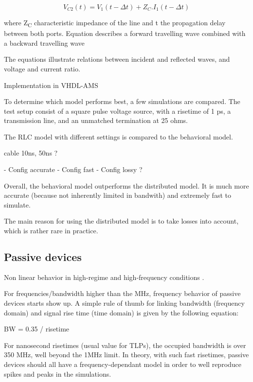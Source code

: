 \begin{equation}
V_{C2}(t) = V_{1}(t - \Delta t) + Z_{C}.I_{1}(t - \Delta t)
\end{equation}

where Z\textsubscript{C} characteristic impedance of the line and \textDelta{}t the propagation delay between both ports.
Equation describes a forward travelling wave combined with a backward travelling wave


The equations illustrate relations between incident and reflected waves, and voltage and current ratio.

Implementation in VHDL-AMS



To determine which model performs best, a few simulations are compared.
The test setup consist of a square pulse voltage source, with a risetime of 1 ps, a transmission line, and an unmatched termination at 25 ohms.

The RLC model with different settings is compared to the behavioral model.

cable 10ns, 50ns ?

- Config accurate
- Config fast
- Config lossy ?

Overall, the behavioral model outperforms the distributed model.
It is much more accurate (because not inherently limited in bandwith) and extremely fast to simulate.

The main reason for using the distributed model is to take losses into account, which is rather rare in practice.

\subsection{Passive devices}

Non linear behavior in high-regime and high-frequency conditions \cite{capa-esd-cz}.

For frequencies/bandwidth higher than the MHz, frequency behavior of  passive devices starts show up.
A simple rule of thumb for linking bandwidth (frequency domain) and signal rise time (time domain) is given by the following equation:

BW = 0.35 / risetime

For nanosecond risetimes (usual value for TLPs), the occupied bandwidth is over 350 MHz, well beyond the 1MHz limit.
In theory, with such fast risetimes, passive devices should all have a frequency-dependant model in order to well reproduce spikes and peaks in the simulations.

